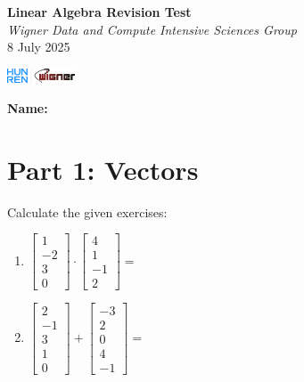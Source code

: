 \documentclass{article}
\begin{document}
\begin{minipage}{0.8\textwidth}
	\centering
	{\Large\textbf{Linear Algebra Revision Test}\\ \textit{Wigner Data and Compute Intensive Sciences Group}}\\
	\vspace*{0.25cm}
	{\normalsize 8 July 2025}
\end{minipage}
\begin{minipage}{0.2\textwidth}
	\includegraphics[width=2cm]{../img/logo.png}
\end{minipage}

\vspace{0.75cm}

\textbf{Name:} \underline{\hspace{5cm}}

\section*{Part 1: Vectors}
Calculate the given exercises:

\begin{enumerate}
	\item $\begin{bmatrix} 1 \\ -2 \\ 3 \\ 0 \end{bmatrix} \cdot \begin{bmatrix} 4 \\ 1 \\ -1 \\ 2 \end{bmatrix} = $ \underline{\hspace{3cm}}
	
	\item $\begin{bmatrix} 2 \\ -1 \\ 3 \\ 1 \\ 0 \end{bmatrix} + \begin{bmatrix} -3 \\ 2 \\ 0 \\ 4 \\ -1 \end{bmatrix} = $ \underline{\hspace{3cm}}
\end{enumerate}
\end{document}

